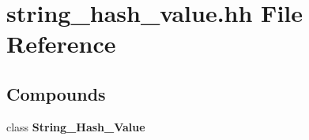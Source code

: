 \section{string\_\-hash\_\-value.hh File Reference}
\label{string__hash__value_8hh}
\subsection*{Compounds}
\begin{CompactItemize}
\item 
class {\bf String\_\-Hash\_\-Value}
\end{CompactItemize}
